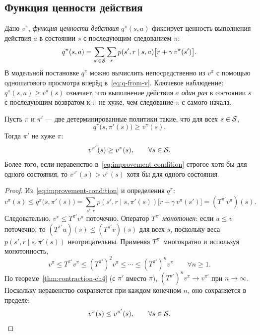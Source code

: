 \subsection*{Функция ценности действия}

Дано $v^\pi$, \emph{функция ценности действия} $q^\pi(s,a)$ фиксирует ценность выполнения действия $a$ в состоянии $s$ с последующим следованием $\pi$:
\begin{equation}
\label{eq:q-from-v}
q^\pi(s,a) = \sum_{s' \in \mathcal{S}}\sum_r p(s',r \mid s,a)\bigl[r + \gamma\,v^\pi(s')\bigr].
\end{equation}
В модельной постановке $q^\pi$ можно вычислить непосредственно из $v^\pi$ с помощью одношагового просмотра вперёд в~\eqref{eq:q-from-v}.  Ключевое наблюдение: $q^\pi(s, a) \ge v^\pi(s)$ означает, что выполнение действия $a$ \emph{один раз} в состоянии $s$ с последующим возвратом к $\pi$ не хуже, чем следование $\pi$ с самого начала.

\begin{theorem}
\label{thm:policy-improvement}
Пусть $\pi$ и $\pi'$ — две детерминированные политики такие, что для всех $s \in \mathcal{S}$,
\begin{equation}
\label{eq:improvement-condition}
q^\pi\bigl(s, \pi'(s)\bigr) \ge v^\pi(s).
\end{equation}
Тогда $\pi'$ не хуже $\pi$:
\[
v^{\pi'}(s) \ge v^\pi(s), \qquad \forall s \in \mathcal{S}.
\]
Более того, если неравенство в~\eqref{eq:improvement-condition} строгое хотя бы для одного состояния, то $v^{\pi'}(s) > v^\pi(s)$ хотя бы для одного состояния.
\end{theorem}

\begin{proof}
Из~\eqref{eq:improvement-condition} и определения $q^\pi$:
\[
v^\pi(s) \le q^\pi\bigl(s, \pi'(s)\bigr)
= \sum_{s',r} p(s',r \mid s, \pi'(s))\bigl[r + \gamma\,v^\pi(s')\bigr]
= (T^{\pi'} v^\pi)(s).
\]
Следовательно, $v^\pi \le T^{\pi'} v^\pi$ поточечно.  Оператор $T^{\pi'}$ \emph{монотонен}: если $u \le v$ поточечно, то $(T^{\pi'} u)(s) \le (T^{\pi'} v)(s)$ для всех $s$, поскольку веса $p(s',r \mid s, \pi'(s))$ неотрицательны.  Применяя $T^{\pi'}$ многократно и используя монотонность,
\[
v^\pi \le T^{\pi'} v^\pi \le (T^{\pi'})^2 v^\pi \le \cdots \le (T^{\pi'})^n v^\pi \qquad \forall n \ge 1.
\]
По теореме~\ref{thm:contraction-ch4} (с $\pi'$ вместо $\pi$), $(T^{\pi'})^n v^\pi \to v^{\pi'}$ при $n \to \infty$.  Поскольку неравенство сохраняется при каждом конечном $n$, оно сохраняется в пределе:
\[
v^\pi(s) \le v^{\pi'}(s), \qquad \forall s \in \mathcal{S}. \qedhere
\]
\end{proof}


